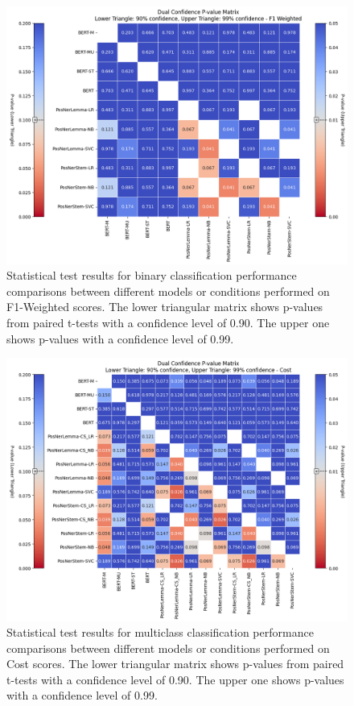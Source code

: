 \documentclass[twocolumn]{ceurart}
\begin{document}
\begin{figure}[htbp]
    \centering
        \includegraphics[width=1.0\columnwidth]{rsc/binary_statistical_tests2.png}%
    \caption{Statistical test results for binary classification performance comparisons between different models or conditions performed on F1-Weighted scores. The lower triangular matrix shows p-values from paired t-tests with a confidence level of 0.90. The upper one shows p-values with a confidence level of 0.99.}
    \label{fig:binary_statistical_tests}
\end{figure}

\begin{figure}[htbp]
    \centering
        \includegraphics[width=1.0\columnwidth]{rsc/multiclass_statistical_tests2.png}%
    \caption{Statistical test results for multiclass classification performance comparisons between different models or conditions performed on Cost scores. The lower triangular matrix shows p-values from paired t-tests with a confidence level of 0.90. The upper one shows p-values with a confidence level of 0.99.}
    \label{fig:multiclass_statistical_tests}
\end{figure}
\end{document}
